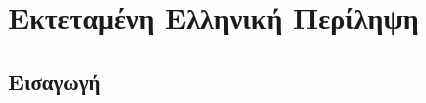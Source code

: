 %
%
%
%
\renewcommand{\thesection}{\arabic{section}}

\chapter*{\textgreek{Εκτεταμένη Ελληνική Περίληψη}}
\label{chap:greek-summary}


\section{Εισαγωγή}

